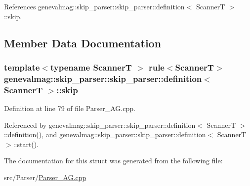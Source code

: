 References genevalmag::skip\_\-parser::skip\_\-parser::definition$<$ ScannerT $>$::skip.

\subsection{Member Data Documentation}
\hypertarget{structgenevalmag_1_1skip__parser_1_1definition_d8644fb67b5f8a7a6fc6c0a3feb34c03}{
\subsubsection[{skip}]{\setlength{\rightskip}{0pt plus 5cm}template$<$typename ScannerT $>$ rule$<$ScannerT$>$ genevalmag::skip\_\-parser::skip\_\-parser::definition$<$ ScannerT $>$::{\bf skip}}}
\label{structgenevalmag_1_1skip__parser_1_1definition_d8644fb67b5f8a7a6fc6c0a3feb34c03}




Definition at line 79 of file Parser\_\-AG.cpp.

Referenced by genevalmag::skip\_\-parser::skip\_\-parser::definition$<$ ScannerT $>$::definition(), and genevalmag::skip\_\-parser::skip\_\-parser::definition$<$ ScannerT $>$::start().

The documentation for this struct was generated from the following file:\begin{CompactItemize}
\item 
src/Parser/\hyperlink{Parser__AG_8cpp}{Parser\_\-AG.cpp}\end{CompactItemize}
